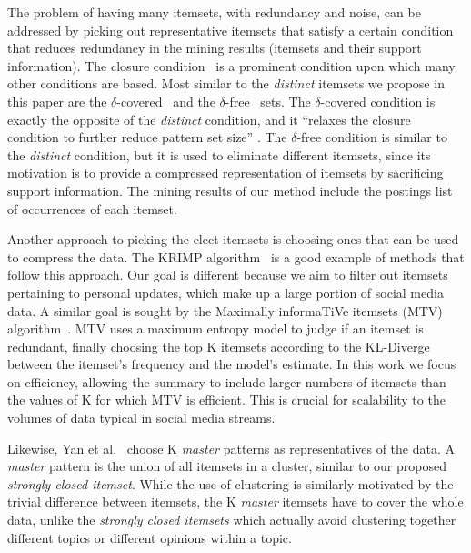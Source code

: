 \documentclass{sig-alternate}
\begin{document}
The problem of having many itemsets, with redundancy and noise, can be addressed by
picking out  representative itemsets that satisfy a certain condition
that reduces redundancy in the mining results (itemsets and their support information).
The closure condition~\cite{pasquier1999discovering} is a prominent condition
upon which many other conditions are based.
Most similar to the \emph{distinct} itemsets we propose in this paper
are the $\delta$-covered~\cite{xin2005mining} and the
$\delta$-free~\cite{boulicaut2003free} sets.
The $\delta$-covered condition is exactly the opposite of the \emph{distinct}
condition, and it ``relaxes the closure condition to further reduce pattern
set size'' \cite{liu2012finding}.
The $\delta$-free condition is similar to the \emph{distinct} condition,
but it is used to eliminate different itemsets, since its motivation
is to provide a compressed representation of itemsets by sacrificing support
information. The mining results of our method include the postings list of
occurrences of each itemset.

Another approach to picking the elect itemsets is choosing ones that 
can be used to compress the data. The KRIMP algorithm~\cite{vreeken2011krimp} is 
a good example of methods that follow this approach. Our goal is different because
we aim to filter out itemsets pertaining to personal updates, which make up a large
portion of social media data. 
A similar goal is sought by the Maximally informaTiVe itemsets (MTV) algorithm~\cite{mampaey2011tell}. 
MTV uses a maximum entropy model to judge if an itemset is redundant, finally choosing the
top K itemsets according to the KL-Diverge between the itemset's  frequency and  the model's estimate. 
In this work we focus on efficiency, allowing the summary to include larger numbers
of itemsets than the values of K for which MTV is efficient.
This is crucial for scalability to the volumes of data typical in social media streams.

Likewise, Yan et al.~\cite{yan2005summarizing} choose K \emph{master} patterns as representatives of the data. A \emph{master} pattern is the union of all itemsets in a cluster, similar to our proposed \emph{strongly closed itemset}. 
While the use of clustering is similarly motivated by the trivial difference between itemsets, the K \emph{master} itemsets  have to cover the whole data, unlike the \emph{strongly closed itemsets} which actually avoid clustering together different topics or different opinions within a topic.
\end{document}
